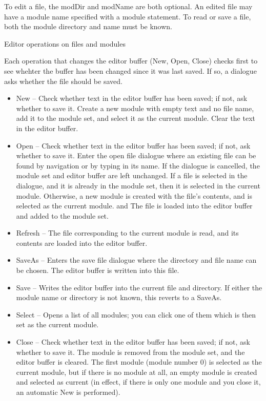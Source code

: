 \documentclass[11pt]{article}
\begin{document}
To edit a file, the modDir and modName are both optional.  An edited
file may have a module name specified with a module statement.  To
read or save a file, both the module directory and name must be known.

Editor operations on files and modules

Each operation that changes the editor buffer (New, Open, Close)
checks first to see whehter the buffer has been changed since it was
last saved.  If so, a dialogue asks whether the file should be saved.

\begin{itemize}
\item New -- Check whether text in the editor buffer has been saved; if
not, ask whether to save it.  Create a new module with empty text
and no file name, add it to the module set, and select it as the
current module.  Clear the text in the editor buffer.

\item Open -- Check whether text in the editor buffer has been saved; if
not, ask whether to save it.  Enter the open file dialogue where an
existing file can be found by navigation or by typing in its name.
If the dialogue is cancelled, the module set and editor buffer are
left unchanged.  If a file is selected in the dialogue, and it is
already in the module set, then it is selected in the current
module.  Otherwise, a new module is created with the file's
contents, and is selected as the current module.  and The file is
loaded into the editor buffer and added to the module set.

\item Refresh -- The file corresponding to the current module is read, and
its contents are loaded into the editor buffer.

\item SaveAs -- Enters the save file dialogue where the directory and file
name can be chosen.  The editor buffer is written into this file.

\item Save -- Writes the editor buffer into the current file and
directory.  If either the module name or directory is not known,
this reverts to a SaveAs.

\item Select -- Opens a list of all modules; you can click one of them
which is then set as the current module.

\item Close -- Check whether text in the editor buffer has been saved; if
not, ask whether to save it. The module is removed from the module
set, and the editor buffer is cleared.  The first module (module
number 0) is selected as the current module, but if there is no
module at all, an empty module is created and selected as current
(in effect, if there is only one module and you close it, an
automatic New is performed).


\end{itemize}
\end{document}
